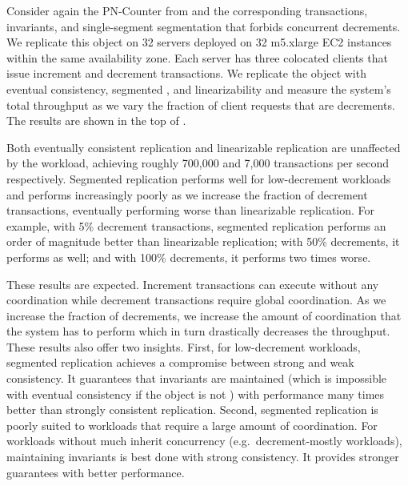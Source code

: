 \begin{benchmark}
  Consider again the PN-Counter from  and the
  corresponding transactions, invariants, and single-segment segmentation that
  forbids concurrent decrements. We replicate this object on 32 servers
  deployed on 32 m5.xlarge EC2 instances within the same availability zone.
  Each server has three colocated clients that issue increment and decrement
  transactions. We replicate the object with eventual consistency, segmented
  \invariantconfluence{}, and linearizability and measure the system's total
  throughput as we vary the fraction of client requests that are decrements.
  The results are shown in the top of .

  Both eventually consistent replication and linearizable replication are
  unaffected by the workload, achieving roughly 700,000 and 7,000 transactions
  per second respectively. Segmented \invariantconfluent{} replication performs
  well for low-decrement workloads and performs increasingly poorly as we
  increase the fraction of decrement transactions, eventually performing worse
  than linearizable replication. For example, with 5\% decrement transactions,
  segmented \invariantconfluent{} replication performs an order of magnitude
  better than linearizable replication; with 50\% decrements, it performs as
  well; and with 100\% decrements, it performs two times worse.

  These results are expected. Increment transactions can execute without any
  coordination while decrement transactions require global coordination. As we
  increase the fraction of decrements, we increase the amount of coordination
  that the system has to perform which in turn drastically decreases the
  throughput. These results also offer two insights.
  First, for low-decrement workloads, segmented \invariantconfluent{}
  replication achieves a compromise between strong and weak consistency. It
  guarantees that invariants are maintained (which is impossible with eventual
  consistency if the object is not \invariantconfluent{}) with performance many
  times better than strongly consistent replication.
  Second, segmented \invariantconfluent{} replication is poorly suited to
  workloads that require a large amount of coordination. For workloads without
  much inherit concurrency (e.g.\ decrement-mostly workloads), maintaining
  invariants is best done with strong consistency. It provides stronger
  guarantees with better performance.
\end{benchmark}

